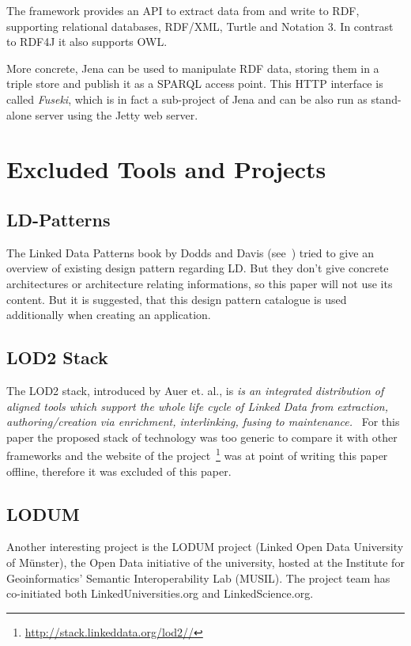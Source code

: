 The framework provides an API to extract data from and write to RDF, supporting relational databases, RDF/XML, Turtle and Notation 3. In contrast to RDF4J it also supports OWL.

More concrete, Jena can be used to manipulate RDF data, storing them in a triple store and publish it as a SPARQL access point. This HTTP interface is called \emph{Fuseki}, which is in fact a sub-project of Jena and can be also run as stand-alone server using the Jetty web server.

\newpage
\section{Excluded Tools and Projects}\label{excluded}

\subsection{LD-Patterns}
The Linked Data Patterns book by Dodds and Davis (see~\cite{dodds2011linked}) tried to give an overview of existing design pattern regarding LD. But they don't give concrete architectures or architecture relating informations, so this paper will not use its content. But it is suggested, that this design pattern catalogue is used additionally when creating an application.

\subsection{LOD2 Stack}

The LOD2 stack, introduced by Auer et. al., is \emph{is an integrated distribution of aligned tools which support the whole life cycle of Linked Data from extraction, authoring/creation via enrichment, interlinking, fusing to maintenance.}~\cite{auer2012managing} For this paper the proposed stack of technology was too generic to compare it with other frameworks and the website of the project~\footnote{\url{http://stack.linkeddata.org/lod2//}} was at point of writing this paper offline, therefore it was excluded of this paper.

\subsection{LODUM}

Another interesting project is the LODUM project (Linked Open Data University of Münster), the Open Data initiative of the university, hosted at the Institute for Geoinformatics' Semantic Interoperability Lab (MUSIL). The project team has co-initiated both LinkedUniversities.org and LinkedScience.org.


